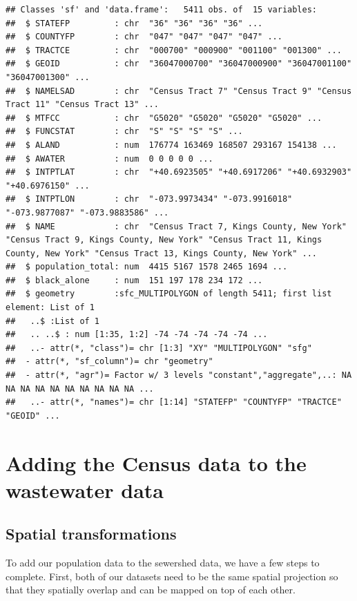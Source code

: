 \documentclass[
]{book}
\begin{document}
\begin{verbatim}
## Classes 'sf' and 'data.frame':   5411 obs. of  15 variables:
##  $ STATEFP         : chr  "36" "36" "36" "36" ...
##  $ COUNTYFP        : chr  "047" "047" "047" "047" ...
##  $ TRACTCE         : chr  "000700" "000900" "001100" "001300" ...
##  $ GEOID           : chr  "36047000700" "36047000900" "36047001100" "36047001300" ...
##  $ NAMELSAD        : chr  "Census Tract 7" "Census Tract 9" "Census Tract 11" "Census Tract 13" ...
##  $ MTFCC           : chr  "G5020" "G5020" "G5020" "G5020" ...
##  $ FUNCSTAT        : chr  "S" "S" "S" "S" ...
##  $ ALAND           : num  176774 163469 168507 293167 154138 ...
##  $ AWATER          : num  0 0 0 0 0 ...
##  $ INTPTLAT        : chr  "+40.6923505" "+40.6917206" "+40.6932903" "+40.6976150" ...
##  $ INTPTLON        : chr  "-073.9973434" "-073.9916018" "-073.9877087" "-073.9883586" ...
##  $ NAME            : chr  "Census Tract 7, Kings County, New York" "Census Tract 9, Kings County, New York" "Census Tract 11, Kings County, New York" "Census Tract 13, Kings County, New York" ...
##  $ population_total: num  4415 5167 1578 2465 1694 ...
##  $ black_alone     : num  151 197 178 234 172 ...
##  $ geometry        :sfc_MULTIPOLYGON of length 5411; first list element: List of 1
##   ..$ :List of 1
##   .. ..$ : num [1:35, 1:2] -74 -74 -74 -74 -74 ...
##   ..- attr(*, "class")= chr [1:3] "XY" "MULTIPOLYGON" "sfg"
##  - attr(*, "sf_column")= chr "geometry"
##  - attr(*, "agr")= Factor w/ 3 levels "constant","aggregate",..: NA NA NA NA NA NA NA NA NA NA ...
##   ..- attr(*, "names")= chr [1:14] "STATEFP" "COUNTYFP" "TRACTCE" "GEOID" ...
\end{verbatim}

\section{Adding the Census data to the wastewater data}\label{adding-the-census-data-to-the-wastewater-data}

\subsection{Spatial transformations}\label{spatial-transformations}

To add our population data to the sewershed data, we have a few steps to complete. First, both of our datasets need to be the same spatial projection so that they spatially overlap and can be mapped on top of each other.
\end{document}
